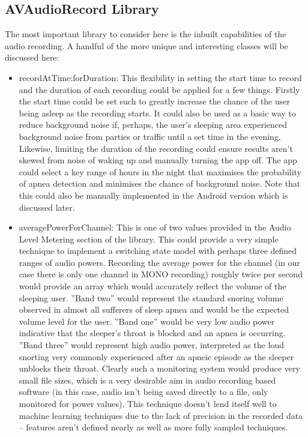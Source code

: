 \subsection{AVAudioRecord Library}
The most important library to consider here is the inbuilt capabilities of the audio recording. A handful of the more unique and interesting classes will be discussed here:
\begin{itemize}
\item recordAtTime:forDuration: This flexibility in setting the start time to record and the duration of each recording could be applied for a few things. Firstly the start time could be set such to greatly increase the chance of the user being asleep as the recording starts. It could also be used as a basic way to reduce background noise if, perhaps, the user’s sleeping area experienced background noise from parties or traffic until a set time in the evening. Likewise, limiting the duration of the recording could ensure results aren’t skewed from noise of waking up and manually turning the app off. The app could select a key range of hours in the night that maximises the probability of apnea detection and minimises the chance of background noise. Note that this could also be manually implemented in the Android version which is discussed later.
\item averagePowerForChannel: This is one of two values provided in the Audio Level Metering section of the library. This could provide a very simple technique to implement a switching state model with perhaps three defined ranges of audio powers. Recording the average power for the channel (in our case there is only one channel in MONO recording) roughly twice per second would provide an array which would accurately reflect the volume of the sleeping user. ''Band two'' would represent the standard snoring volume observed in almost all sufferers of sleep apnea and would be the expected volume level for the user. ''Band one'' would be very low audio power indicative that the sleeper’s throat is blocked and an apnea is occurring. ''Band three'' would represent high audio power, interpreted as the loud snorting very commonly experienced after an apneic episode as the sleeper unblocks their throat. Clearly such a monitoring system would produce very small file sizes, which is a very desirable aim in audio recording based software (in this case, audio isn’t being saved directly to a file, only monitored for power values). This technique doesn’t lend itself well to machine learning techniques due to the lack of precision in the recorded data – features aren’t defined nearly as well as more fully sampled techniques.

\end{itemize}
